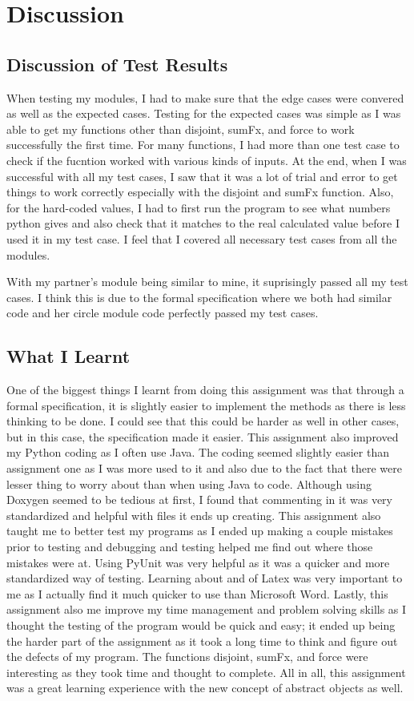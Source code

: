 \documentclass[12pt]{article}
\begin{document}
\section{Discussion}
\subsection{Discussion of Test Results}
When testing my modules, I had to make sure that the edge cases were convered as well as the expected cases. Testing for the expected cases was simple as I was able to get my functions other than disjoint, sumFx, and force to work successfully the first time. For many functions, I had more than one test case to check if the fucntion worked with various kinds of inputs. At the end, when I was successful with all my test cases, I saw that it was a lot of trial and error to get things to work correctly especially with the disjoint and sumFx function. Also, for the hard-coded values, I had to first run the program to see what numbers python gives and also check that it matches to the real calculated value before I used it in my test case. I feel that I covered all necessary test cases from all the modules.


With my partner's module being similar to mine, it suprisingly passed all my test cases. I think this is due to the formal specification where we both had similar code and her circle module code perfectly passed my test cases.


\subsection{What I Learnt}
One of the biggest things I learnt from doing this assignment was that through a formal specification, it is slightly easier to implement the methods as there is less thinking to be done. I could see that this could be harder as well in other cases, but in this case, the specification made it easier. This assignment also improved my Python coding as I often use Java. The coding seemed slightly easier than assignment one as I was more used to it and also due to the fact that there were lesser thing to worry about than when using Java to code. Although using Doxygen seemed to be tedious at first, I found that commenting in it was very standardized and helpful with files it ends up creating. This assignment also taught me to better test my programs as I ended up making a couple mistakes prior to testing and debugging and testing helped me find out where those mistakes were at. Using PyUnit was very helpful as it was a quicker and more standardized way of testing. Learning about and of Latex was very important to me as I actually find it much quicker to use than Microsoft Word. Lastly, this assignment also me improve my time management and problem solving skills as I thought the testing of the program would be quick and easy; it ended up being the harder part of the assignment as it took a long time to think and figure out the defects of my program. The functions disjoint, sumFx, and force were interesting as they took time and thought to complete. All in all, this assignment was a great learning experience with the new concept of abstract objects as well. 
\end{document}
